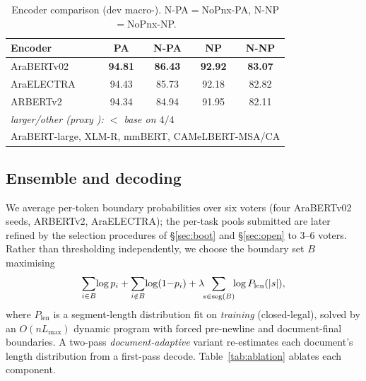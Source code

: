 \begin{table}[t]\centering\small
\begin{tabular}{lcccc}
\toprule
Encoder & PA & N-PA & NP & N-NP \\
\midrule
AraBERTv02 & \textbf{94.81} & \textbf{86.43} & \textbf{92.92} & \textbf{83.07} \\
AraELECTRA & 94.43 & 85.73 & 92.18 & 82.82 \\
ARBERTv2   & 94.34 & 84.94 & 91.95 & 82.11 \\
\midrule
\multicolumn{5}{l}{\emph{larger/other (proxy \fone{}): $<$ base on $4/4$}}\\
\multicolumn{5}{l}{\;AraBERT-large, XLM-R, mmBERT, CAMeLBERT-MSA/CA}\\
\bottomrule
\end{tabular}
\caption{Encoder comparison (dev macro-\fone{}). N-PA$=$NoPnx-PA, N-NP$=$NoPnx-NP.}
\label{tab:encoders}
\end{table}

\subsection{Ensemble and decoding}
We average per-token boundary probabilities over six voters (four AraBERTv02 seeds,
ARBERT\-v2, AraELECTRA); the per-task pools submitted are later refined by the
selection procedures of \S\ref{sec:boot} and \S\ref{sec:open} to $3$--$6$ voters. Rather than thresholding independently, we choose the
boundary set $B$ maximising
\begin{equation}\small
\sum_{i\in B}\!\log p_i + \sum_{i\notin B}\!\log(1{-}p_i)
+ \lambda\!\!\sum_{s\in\mathrm{seg}(B)}\!\!\log P_{\mathrm{len}}(|s|),
\end{equation}
where $P_{\mathrm{len}}$ is a segment-length distribution fit on \emph{training}
(closed-legal), solved by an $O(nL_{\max})$ dynamic program with forced pre-newline
and document-final boundaries. A two-pass \emph{document-adaptive} variant re-estimates
each document's length distribution from a first-pass decode. Table~\ref{tab:ablation}
ablates each component.

